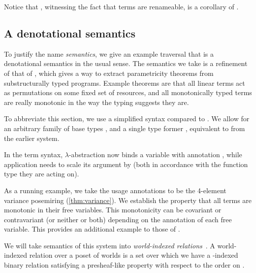 
Notice that , witnessing the fact
that terms are renameable, is a corollary of .


\subsection{A denotational semantics}

To justify the name \emph{semantics}, we give an example traversal that is a
denotational semantics in the usual sense.
The semantics we take is a refinement of that of \citet{AbelBernardy2020},
which gives a way to extract parametricity theorems from substructurally typed
programs.
Example theorems are that all linear terms act as permutations on some fixed
set of resources, and all monotonically typed terms are really monotonic in the
way the typing suggests they are.

To abbreviate this section, we use a simplified syntax compared to \name{}.
We allow for an arbitrary family of base types , and a single
type former \mbox{}, equivalent to
\mbox{} from the earlier system.


In the term syntax, $\lambda$-abstraction now binds a variable with annotation
, while application needs to scale its argument by 
(both in accordance with the function type they are acting on).


As a running example, we take the usage annotations to be the 4-element
variance posemiring (\cref{thm:variance}).
We establish the property that all terms are monotonic in their free variables.
This monotonicity can be covariant or contravariant (or neither or both)
depending on the annotation of each free variable.
This provides an additional example to those of \citeauthor{AbelBernardy2020}.

We will take semantics of this system into
\emph{world-indexed relations}~\cite{AbelBernardy2020,context-constrained}.
A world-indexed relation over a poset of worlds  is a set over
which
we have a -indexed binary relation satisfying a presheaf-like
property with respect to the order on .

